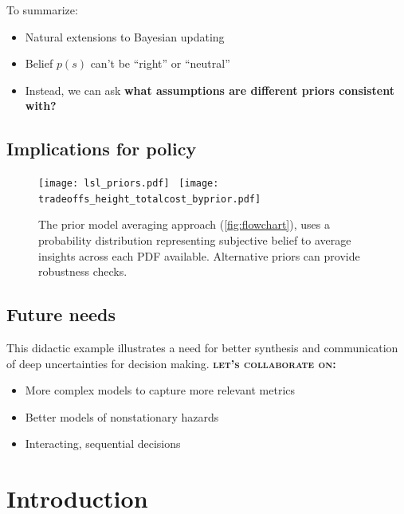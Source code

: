 \documentclass[12pt]{article}
\begin{document}
To summarize:
\begin{itemize}
    \item Natural extensions to Bayesian updating
    \item Belief $p(s)$ can't be ``right''  \citep{gelman_workflow:2020,gelman_philosophy:2013} or ``neutral'' \citep{quinn_exploratory:2020}
    \item Instead, we can ask \textbf{what assumptions are different priors consistent with?}
\end{itemize}

\subsection{Implications for policy}

\begin{figure}
    \centering
    \texttt{[image: lsl\_priors.pdf]}~
    \texttt{[image: tradeoffs\_height\_totalcost\_byprior.pdf]}
    \caption{
        The prior model averaging approach (\cref{fig:flowchart}), uses a probability distribution representing subjective belief to average insights across each PDF available.
        Alternative priors can provide robustness checks.
    }
\end{figure}


\subsection{Future needs}
This didactic example illustrates a need for better synthesis and communication of deep uncertainties for decision making.
\textbf{\scshape let's collaborate on:}
\begin{itemize}
    \item More complex models to capture more relevant metrics
    \item Better models of nonstationary hazards
    \item Interacting, sequential decisions
\end{itemize}

\clearpage
\section{Introduction}
\end{document}
